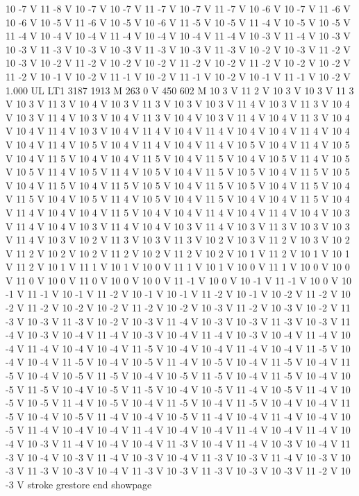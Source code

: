 {10 -7 V
11 -8 V
10 -7 V
10 -7 V
11 -7 V
10 -7 V
11 -7 V
10 -6 V
10 -7 V
11 -6 V
10 -6 V
10 -5 V
11 -6 V
10 -5 V
10 -6 V
11 -5 V
10 -5 V
11 -4 V
10 -5 V
10 -5 V
11 -4 V
10 -4 V
10 -4 V
11 -4 V
10 -4 V
10 -4 V
11 -4 V
10 -3 V
11 -4 V
10 -3 V
10 -3 V
11 -3 V
10 -3 V
10 -3 V
11 -3 V
10 -3 V
11 -3 V
10 -2 V
10 -3 V
11 -2 V
10 -3 V
10 -2 V
11 -2 V
10 -2 V
10 -2 V
11 -2 V
10 -2 V
11 -2 V
10 -2 V
10 -2 V
11 -2 V
10 -1 V
10 -2 V
11 -1 V
10 -2 V
11 -1 V
10 -2 V
10 -1 V
11 -1 V
10 -2 V
1.000 UL
LT1
3187 1913 M
263 0 V
450 602 M
10 3 V
11 2 V
10 3 V
10 3 V
11 3 V
10 3 V
11 3 V
10 4 V
10 3 V
11 3 V
10 3 V
10 3 V
11 4 V
10 3 V
11 3 V
10 4 V
10 3 V
11 4 V
10 3 V
10 4 V
11 3 V
10 4 V
10 3 V
11 4 V
10 4 V
11 3 V
10 4 V
10 4 V
11 4 V
10 3 V
10 4 V
11 4 V
10 4 V
11 4 V
10 4 V
10 4 V
11 4 V
10 4 V
10 4 V
11 4 V
10 5 V
10 4 V
11 4 V
10 4 V
11 4 V
10 5 V
10 4 V
11 4 V
10 5 V
10 4 V
11 5 V
10 4 V
10 4 V
11 5 V
10 4 V
11 5 V
10 4 V
10 5 V
11 4 V
10 5 V
10 5 V
11 4 V
10 5 V
11 4 V
10 5 V
10 4 V
11 5 V
10 5 V
10 4 V
11 5 V
10 5 V
10 4 V
11 5 V
10 4 V
11 5 V
10 5 V
10 4 V
11 5 V
10 5 V
10 4 V
11 5 V
10 4 V
11 5 V
10 4 V
10 5 V
11 4 V
10 5 V
10 4 V
11 5 V
10 4 V
10 4 V
11 5 V
10 4 V
11 4 V
10 4 V
10 4 V
11 5 V
10 4 V
10 4 V
11 4 V
10 4 V
11 4 V
10 4 V
10 3 V
11 4 V
10 4 V
10 3 V
11 4 V
10 4 V
10 3 V
11 4 V
10 3 V
11 3 V
10 3 V
10 3 V
11 4 V
10 3 V
10 2 V
11 3 V
10 3 V
11 3 V
10 2 V
10 3 V
11 2 V
10 3 V
10 2 V
11 2 V
10 2 V
10 2 V
11 2 V
10 2 V
11 2 V
10 2 V
10 1 V
11 2 V
10 1 V
10 1 V
11 2 V
10 1 V
11 1 V
10 1 V
10 0 V
11 1 V
10 1 V
10 0 V
11 1 V
10 0 V
10 0 V
11 0 V
10 0 V
11 0 V
10 0 V
10 0 V
11 -1 V
10 0 V
10 -1 V
11 -1 V
10 0 V
10 -1 V
11 -1 V
10 -1 V
11 -2 V
10 -1 V
10 -1 V
11 -2 V
10 -1 V
10 -2 V
11 -2 V
10 -2 V
11 -2 V
10 -2 V
10 -2 V
11 -2 V
10 -2 V
10 -3 V
11 -2 V
10 -3 V
10 -2 V
11 -3 V
10 -3 V
11 -3 V
10 -2 V
10 -3 V
11 -4 V
10 -3 V
10 -3 V
11 -3 V
10 -3 V
11 -4 V
10 -3 V
10 -4 V
11 -4 V
10 -3 V
10 -4 V
11 -4 V
10 -3 V
10 -4 V
11 -4 V
10 -4 V
11 -4 V
10 -4 V
10 -4 V
11 -5 V
10 -4 V
10 -4 V
11 -4 V
10 -4 V
11 -5 V
10 -4 V
10 -4 V
11 -5 V
10 -4 V
10 -5 V
11 -4 V
10 -5 V
10 -4 V
11 -5 V
10 -4 V
11 -5 V
10 -4 V
10 -5 V
11 -5 V
10 -4 V
10 -5 V
11 -5 V
10 -4 V
11 -5 V
10 -4 V
10 -5 V
11 -5 V
10 -4 V
10 -5 V
11 -5 V
10 -4 V
10 -5 V
11 -4 V
10 -5 V
11 -4 V
10 -5 V
10 -5 V
11 -4 V
10 -5 V
10 -4 V
11 -5 V
10 -4 V
11 -5 V
10 -4 V
10 -4 V
11 -5 V
10 -4 V
10 -5 V
11 -4 V
10 -4 V
10 -5 V
11 -4 V
10 -4 V
11 -4 V
10 -4 V
10 -5 V
11 -4 V
10 -4 V
10 -4 V
11 -4 V
10 -4 V
10 -4 V
11 -4 V
10 -4 V
11 -4 V
10 -4 V
10 -3 V
11 -4 V
10 -4 V
10 -4 V
11 -3 V
10 -4 V
11 -4 V
10 -3 V
10 -4 V
11 -3 V
10 -4 V
10 -3 V
11 -4 V
10 -3 V
10 -4 V
11 -3 V
10 -3 V
11 -4 V
10 -3 V
10 -3 V
11 -3 V
10 -3 V
10 -4 V
11 -3 V
10 -3 V
11 -3 V
10 -3 V
10 -3 V
11 -2 V
10 -3 V
stroke
grestore
end
showpage
}
